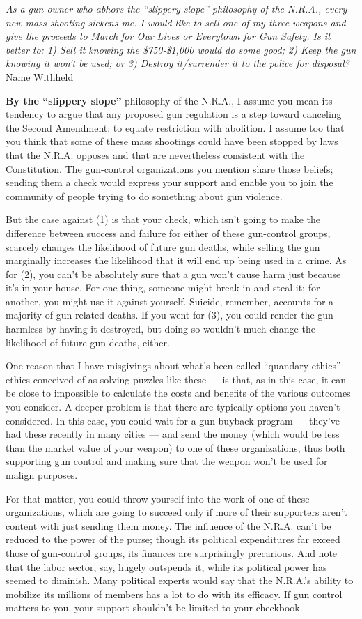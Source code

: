 \emph{As a gun owner who abhors the ``slippery slope'' philosophy of the
N.R.A., every new mass shooting sickens me. I would like to sell one of
my three weapons and give the proceeds to March for Our Lives or
Everytown for Gun Safety. Is it better to: 1) Sell it knowing the
\$750-\$1,000 would do some good; 2) Keep the gun knowing it won't be
used; or 3) Destroy it/surrender it to the police for disposal?} Name
Withheld

\textbf{By the ``slippery slope''} philosophy of the N.R.A., I assume
you mean its tendency to argue that any proposed gun regulation is a
step toward canceling the Second Amendment: to equate restriction with
abolition. I assume too that you think that some of these mass shootings
could have been stopped by laws that the N.R.A. opposes and that are
nevertheless consistent with the Constitution. The gun-control
organizations you mention share those beliefs; sending them a check
would express your support and enable you to join the community of
people trying to do something about gun violence.

But the case against (1) is that your check, which isn't going to make
the difference between success and failure for either of these
gun-control groups, scarcely changes the likelihood of future gun
deaths, while selling the gun marginally increases the likelihood that
it will end up being used in a crime. As for (2), you can't be
absolutely sure that a gun won't cause harm just because it's in your
house. For one thing, someone might break in and steal it; for another,
you might use it against yourself. Suicide, remember, accounts for a
majority of gun-related deaths. If you went for (3), you could render
the gun harmless by having it destroyed, but doing so wouldn't much
change the likelihood of future gun deaths, either.

One reason that I have misgivings about what's been called ``quandary
ethics'' --- ethics conceived of as solving puzzles like these --- is
that, as in this case, it can be close to impossible to calculate the
costs and benefits of the various outcomes you consider. A deeper
problem is that there are typically options you haven't considered. In
this case, you could wait for a gun-buyback program --- they've had
these recently in many cities --- and send the money (which would be
less than the market value of your weapon) to one of these
organizations, thus both supporting gun control and making sure that the
weapon won't be used for malign purposes.

For that matter, you could throw yourself into the work of one of these
organizations, which are going to succeed only if more of their
supporters aren't content with just sending them money. The influence of
the N.R.A. can't be reduced to the power of the purse; though its
political expenditures far exceed those of gun-control groups, its
finances are surprisingly precarious. And note that the labor sector,
say, hugely outspends it, while its political power has seemed to
diminish. Many political experts would say that the N.R.A.'s ability to
mobilize its millions of members has a lot to do with its efficacy. If
gun control matters to you, your support shouldn't be limited to your
checkbook.


